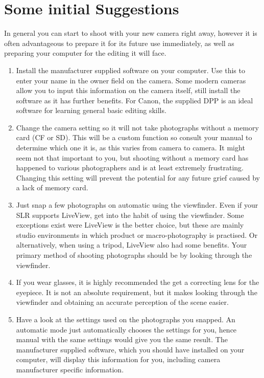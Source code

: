\section{Some initial Suggestions}

In general you can start to shoot with your new camera right away, however it is often advantageous to prepare it for its future use immediately, as well as preparing your computer for the editing it will face.

\begin{enumerate}[i]
	\item Install the manufacturer supplied software on your computer. Use this to enter your name in the owner field on the camera. Some modern cameras allow you to input this information on the camera itself, still install the software as it has further benefits. For Canon, the supplied \gls{DPP} is an ideal software for learning general basic editing skills.
	
	\item Change the camera setting so it will not take photographs without a memory card (\gls{CF} or \gls{SD}). This will be a custom function so consult your manual to determine which one it is, as this varies from camera to camera. It might seem not that important to you, but shooting without a memory card has happened to various photographers and is at least extremely frustrating. Changing this setting will prevent the potential  for any future grief caused by a lack of memory card.
	
	\item Just snap a few photographs on automatic using the \gls{viewfinder}. Even if your \gls{SLR} supports \gls{LiveView}, get into the habit of using the \gls{viewfinder}. Some exceptions exist were \gls{LiveView} is the better choice, but these are mainly studio environments in which product or macro-photography is practised. Or alternatively, when using a tripod, \gls{LiveView} also had some benefits. Your primary method of shooting photographs should be by looking through the \gls{viewfinder}.
	
	\item If you wear glasses, it is highly recommended the get a correcting lens for the eyepiece. It is not an absolute requirement, but it makes looking through the \gls{viewfinder} and obtaining an accurate perception of the scene easier.
	
	\item Have a look at the settings used on the photographs you snapped. An automatic mode just automatically chooses the settings for you, hence manual with the same settings would give you the same result. The manufacturer supplied software, which you should have installed on your computer, will display this information for you, including camera manufacturer specific information.
	

\end{enumerate}
